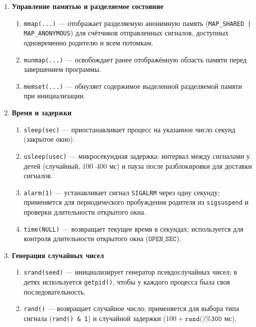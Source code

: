 \begin{enumerate}
        \item \textbf{Управление памятью и разделяемое состояние}

        \begin{enumerate}
            \item \texttt{mmap(...)} — отображает разделяемую анонимную память (\texttt{MAP\_SHARED | MAP\_ANONYMOUS}) для счётчиков отправленных сигналов, доступных одновременно родителю и всем потомкам.
            \item \texttt{munmap(...)} — освобождает ранее отображённую область памяти перед завершением программы.
            \item \texttt{memset(...)} — обнуляет содержимое выделенной разделяемой памяти при инициализации.
        \end{enumerate}

        \item \textbf{Время и задержки}

        \begin{enumerate}
            \item \texttt{sleep(sec)} — приостанавливает процесс на указанное число секунд (закрытое окно).
            \item \texttt{usleep(usec)} — микросекундная задержка: интервал между сигналами у детей (случайный, $100$--$400$ мс) и пауза после разблокировки для доставки сигналов.
            \item \texttt{alarm(1)} — устанавливает сигнал \texttt{SIGALRM} через одну секунду; применяется для периодического пробуждения родителя из \texttt{sigsuspend} и проверки длительности открытого окна.
            \item \texttt{time(NULL)} — возвращает текущее время в секундах; используется для контроля длительности открытого окна ($\texttt{OPEN\_SEC}$).
        \end{enumerate}

        \item \textbf{Генерация случайных чисел}

        \begin{enumerate}
            \item \texttt{srand(seed)} — инициализирует генератор псевдослучайных чисел; в детях используется \texttt{getpid()}, чтобы у каждого процесса была своя последовательность.
            \item \texttt{rand()} — возвращает случайное число; применяется для выбора типа сигнала (\texttt{rand() \& 1}) и случайной задержки ($100 + \texttt{rand()\%300}$ мс).
        \end{enumerate}


\end{enumerate}
